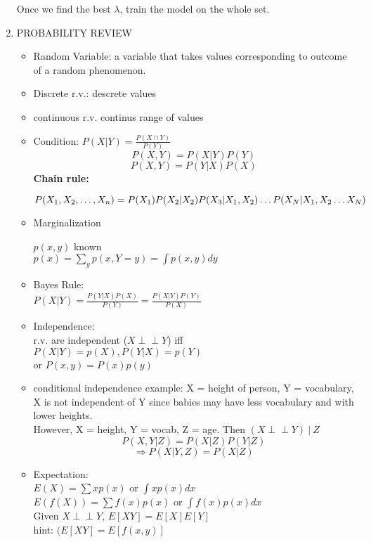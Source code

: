 \documentclass[12pt]{article}
\newcommand{\indep}{\perp \!\!\! \perp}
\begin{document}
\begin{enumerate}
            Once we find the best $\lambda$, train the model on the whole set.

            \item PROBABILITY REVIEW
            \begin{itemize}
                \item Random Variable: a variable that takes values corresponding to outcome of a random phenomenon.
                \item Discrete r.v.: descrete values
                \item continuous r.v. continus range of values
                \item Condition: $P(X|Y) = \frac{P(X \cap Y)}{P(Y)}$
                $$P(X,Y) = P(X|Y)P(Y)$$
                $$P(X,Y) = P(Y|X)P(X)$$
                \textbf{Chain rule:} 
                
                $P(X_1, X_2, \dots, X_n) = P(X_1)P(X_2|X_2)P(X_3|X_1,X_2)\\ \dots P(X_N|X_1,X_2 \dots X_N) $

                \item Marginalization
                
                $p(x,y)$ known\\
                $p(x) = \sum\limits_y p(x, Y= y) = \int p(x,y)dy$  

                \item Bayes Rule:\\
                $P(X|Y) = \frac{P(Y|X)P(X)}{P(Y)} = \frac{P(X|Y)P(Y)}{P(X)} $

                \item Independence: \\
                r.v. are independent ($X\indep Y$) iff \\
                $P(X|Y) = p(X), P(Y|X) = p(Y)$
                \\or $P(x,y) =P(x)p(y)$
                \item conditional independence
                example: X = height of person, Y = vocabulary, X is not independent of Y since babies may have less vocabulary and with lower heights.\\
                However, X = height, Y = vocab, Z = age. Then $(X\indep Y)\ | \ Z$
                $$P(X,Y|Z) = P(X|Z)P(Y|Z)$$
                $$\Rightarrow P(X|Y, Z) = P(X|Z)$$

                \item Expectation:\\
                $E(X) = \sum xp(x) $ or $\int xp(x)dx$\\
                $E(f(X)) = \sum f(x)p(x)$ or $\int f(x)p(x)dx$\\
                Given $X\indep Y$, $E[XY] = E[X]E[Y] $ \\
                hint: $(E[XY] = E[f(x,y)]$


\end{itemize}
\end{enumerate}
\end{document}
